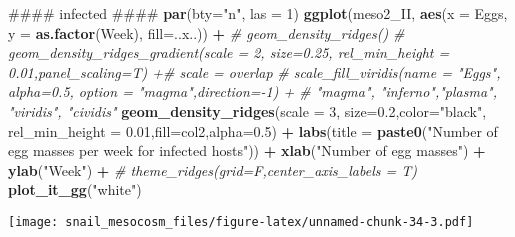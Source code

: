 \documentclass[10,portrait]{article}
\newenvironment{Shaded}{\begin{snugshade}}{\end{snugshade}}
\newcommand{\KeywordTok}[1]{\textcolor[rgb]{0.13,0.29,0.53}{\textbf{#1}}}
\newcommand{\DataTypeTok}[1]{\textcolor[rgb]{0.13,0.29,0.53}{#1}}
\newcommand{\DecValTok}[1]{\textcolor[rgb]{0.00,0.00,0.81}{#1}}
\newcommand{\FloatTok}[1]{\textcolor[rgb]{0.00,0.00,0.81}{#1}}
\newcommand{\StringTok}[1]{\textcolor[rgb]{0.31,0.60,0.02}{#1}}
\newcommand{\CommentTok}[1]{\textcolor[rgb]{0.56,0.35,0.01}{\textit{#1}}}
\newcommand{\OperatorTok}[1]{\textcolor[rgb]{0.81,0.36,0.00}{\textbf{#1}}}
\newcommand{\NormalTok}[1]{#1}
\begin{document}
\begin{Shaded}
\begin{Highlighting}[]
\NormalTok{#### infected ####}
\KeywordTok{par}\NormalTok{(}\DataTypeTok{bty=}\StringTok{"n"}\NormalTok{, }\DataTypeTok{las =} \DecValTok{1}\NormalTok{)}
\KeywordTok{ggplot}\NormalTok{(meso2_II, }\KeywordTok{aes}\NormalTok{(}\DataTypeTok{x =}\NormalTok{ Eggs, }\DataTypeTok{y =} \KeywordTok{as.factor}\NormalTok{(Week), }\DataTypeTok{fill=}\NormalTok{..x..)) }\OperatorTok{+}\StringTok{ }\CommentTok{# geom_density_ridges()}
\StringTok{  }\CommentTok{# geom_density_ridges_gradient(scale = 2, size=0.25, rel_min_height = 0.01,panel_scaling=T) +# scale = overlap}
\StringTok{  }\CommentTok{# scale_fill_viridis(name = "Eggs", alpha=0.5, option = "magma",direction=-1) + # "magma", "inferno","plasma", "viridis", "cividis"}
\StringTok{  }\KeywordTok{geom_density_ridges}\NormalTok{(}\DataTypeTok{scale =} \DecValTok{3}\NormalTok{, }\DataTypeTok{size=}\FloatTok{0.2}\NormalTok{,}\DataTypeTok{color=}\StringTok{"black"}\NormalTok{, }\DataTypeTok{rel_min_height =} \FloatTok{0.01}\NormalTok{,}\DataTypeTok{fill=}\NormalTok{col2,}\DataTypeTok{alpha=}\FloatTok{0.5}\NormalTok{) }\OperatorTok{+}
\StringTok{  }\KeywordTok{labs}\NormalTok{(}\DataTypeTok{title =} \KeywordTok{paste0}\NormalTok{(}\StringTok{"Number of egg masses per week for infected hosts"}\NormalTok{)) }\OperatorTok{+}
\StringTok{  }\KeywordTok{xlab}\NormalTok{(}\StringTok{"Number of egg masses"}\NormalTok{) }\OperatorTok{+}
\StringTok{  }\KeywordTok{ylab}\NormalTok{(}\StringTok{"Week"}\NormalTok{) }\OperatorTok{+}
\StringTok{  }\CommentTok{# theme_ridges(grid=F,center_axis_labels = T)}
\StringTok{  }\KeywordTok{plot_it_gg}\NormalTok{(}\StringTok{"white"}\NormalTok{)}
\end{Highlighting}
\end{Shaded}

\texttt{[image: snail\_mesocosm\_files/figure-latex/unnamed-chunk-34-3.pdf]}

\printbibliography
\end{document}
